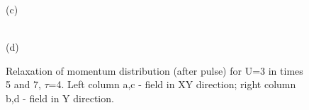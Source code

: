 \begin{figure}[h!]
\begin{minipage}[h]{0.43\linewidth}
\end{minipage}
\begin{minipage}[h]{0.43\linewidth}
 (c) \\
\end{minipage}
\hfill
\begin{minipage}[h]{0.43\linewidth}
 \\(d)
\end{minipage}
\caption{Relaxation of momentum distribution (after pulse) for U=3 in times 5 and 7, $\tau$=4. Left column a,c - field in XY direction; right column b,d - field in Y direction.}
\label{fig:md_u3_A_max_relaxation}
\end{figure}



